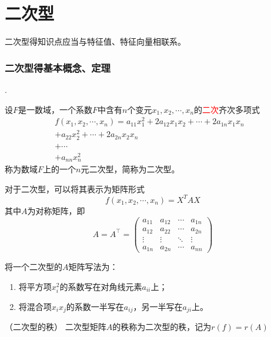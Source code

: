 \part{二次型}
二次型得知识点应当与特征值、特征向量相联系。
\section{二次型得基本概念、定理}
.
\begin{definition}
    设$F$是一数域，一个系数$F$中含有$n$个变元$x_1,x_2,\cdots,x_n$的\textcolor{red}{二次}齐次多项式
    \begin{align*}
        f(x_1,x_2,\cdots,x_n) = a_{11}x_1^2 + 2a_{12}x_1x_2 + \cdots + 2a_{1n}x_1x_n & \\
        +a_{22}x_2^2 + \cdots + 2a_{2n}x_2x_n                                        & \\
        +\cdots                                                                      & \\
        +a_{nn}x_n^2                                                                 &
    \end{align*}
    称为数域$F$上的一个$n$元二次型，简称为二次型。
\end{definition}

对于二次型，可以将其表示为矩阵形式
\begin{equation}
    f(x_1,x_2,\cdots,x_n) = X^TAX
\end{equation}
其中$A$为对称矩阵，即
\[
    A =A^\intercal =
    \begin{pmatrix}
        a_{11} & a_{12} & \cdots & a_{1n} \\
        a_{12} & a_{22} & \cdots & a_{2n} \\
        \vdots & \vdots & \ddots & \vdots \\
        a_{1n} & a_{2n} & \cdots & a_{nn}
    \end{pmatrix}
\]

将一个二次型的$A$矩阵写法为：
\begin{enumerate}
    \item 将平方项$x_i^2$的系数写在对角线元素$a_{ii}$上；
    \item 将混合项$x_ix_j$的系数一半写在$a_{ij}$，另一半写在$a_{ji}$上。
\end{enumerate}

\begin{definition}
    （二次型的秩）
    二次型矩阵$A$的秩称为二次型的秩，记为$r(f)=r(A)$
\end{definition}

